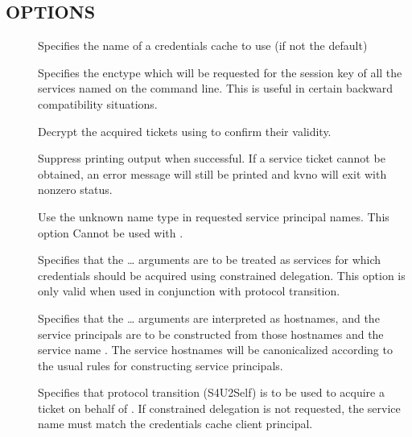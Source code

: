 \documentclass[letterpaper,10pt,english]{sphinxmanual}
\begin{document}
\subsection{OPTIONS}
\label{\detokenize{user/user_commands/kvno:options}}\begin{description}
\item[{ }] \leavevmode
Specifies the name of a credentials cache to use (if not the
default)

\item[{ }] \leavevmode
Specifies the enctype which will be requested for the session key
of all the services named on the command line.  This is useful in
certain backward compatibility situations.

\item[{ }] \leavevmode
Decrypt the acquired tickets using  to confirm their
validity.

\item[{}] \leavevmode
Suppress printing output when successful.  If a service ticket
cannot be obtained, an error message will still be printed and
kvno will exit with nonzero status.

\item[{}] \leavevmode
Use the unknown name type in requested service principal names.
This option Cannot be used with .

\item[{}] \leavevmode
Specifies that the  …  arguments are to be
treated as services for which credentials should be acquired using
constrained delegation.  This option is only valid when used in
conjunction with protocol transition.

\item[{ }] \leavevmode
Specifies that the  … arguments are
interpreted as hostnames, and the service principals are to be
constructed from those hostnames and the service name .
The service hostnames will be canonicalized according to the usual
rules for constructing service principals.

\item[{ }] \leavevmode
Specifies that protocol transition (S4U2Self) is to be used to
acquire a ticket on behalf of .  If constrained
delegation is not requested, the service name must match the
credentials cache client principal.


\end{description}
\end{document}
